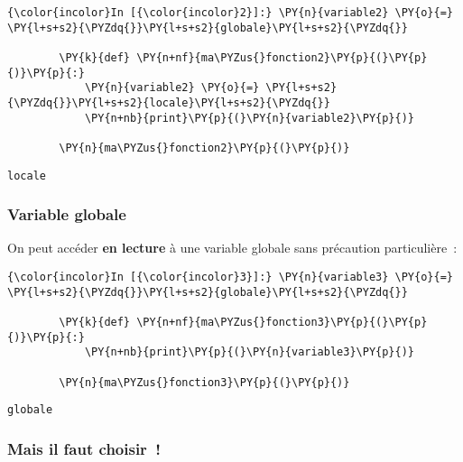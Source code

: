     \begin{Verbatim}[commandchars=\\\{\},frame=single,framerule=0.3mm,rulecolor=\color{cellframecolor}]
{\color{incolor}In [{\color{incolor}2}]:} \PY{n}{variable2} \PY{o}{=} \PY{l+s+s2}{\PYZdq{}}\PY{l+s+s2}{globale}\PY{l+s+s2}{\PYZdq{}}
        
        \PY{k}{def} \PY{n+nf}{ma\PYZus{}fonction2}\PY{p}{(}\PY{p}{)}\PY{p}{:}
            \PY{n}{variable2} \PY{o}{=} \PY{l+s+s2}{\PYZdq{}}\PY{l+s+s2}{locale}\PY{l+s+s2}{\PYZdq{}}
            \PY{n+nb}{print}\PY{p}{(}\PY{n}{variable2}\PY{p}{)}
        
        \PY{n}{ma\PYZus{}fonction2}\PY{p}{(}\PY{p}{)}
\end{Verbatim}


    \begin{Verbatim}[commandchars=\\\{\},frame=single,framerule=0.3mm,rulecolor=\color{cellframecolor}]
locale
\end{Verbatim}

    \hypertarget{variable-globale}{%
\subsubsection{Variable globale}\label{variable-globale}}

    On peut accéder \textbf{en lecture} à une variable globale sans
précaution particulière~:

    \begin{Verbatim}[commandchars=\\\{\},frame=single,framerule=0.3mm,rulecolor=\color{cellframecolor}]
{\color{incolor}In [{\color{incolor}3}]:} \PY{n}{variable3} \PY{o}{=} \PY{l+s+s2}{\PYZdq{}}\PY{l+s+s2}{globale}\PY{l+s+s2}{\PYZdq{}}
        
        \PY{k}{def} \PY{n+nf}{ma\PYZus{}fonction3}\PY{p}{(}\PY{p}{)}\PY{p}{:}
            \PY{n+nb}{print}\PY{p}{(}\PY{n}{variable3}\PY{p}{)}
        
        \PY{n}{ma\PYZus{}fonction3}\PY{p}{(}\PY{p}{)}
\end{Verbatim}


    \begin{Verbatim}[commandchars=\\\{\},frame=single,framerule=0.3mm,rulecolor=\color{cellframecolor}]
globale
\end{Verbatim}

    \hypertarget{mais-il-faut-choisir}{%
\subsubsection{Mais il faut choisir~!}\label{mais-il-faut-choisir}}

